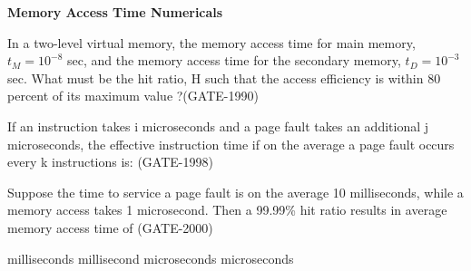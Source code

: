 \centerline{\textbf{ \LARGE Memory Access Time Numericals}}




\begin{questyle}

  \question  In a two-level virtual memory, the memory access time for main memory,   {\large \(  t_{M}=10^{-8}  \) }  sec,
            and the memory access time for the secondary memory,  {\large \( t_D=10^{-3} \) }  sec. What must be the hit
            ratio, H such that the access efficiency is within 80 percent of its maximum value \fillin[] ?(GATE-1990)

\end{questyle}


\begin{questyle}

  \question  If an instruction takes i microseconds and a page fault takes an additional j microseconds, the effective
              instruction time if on the average a  page fault occurs every k instructions is: (GATE-1998)

  \begin{choices}
  \end{choices}

\end{questyle}


\begin{questyle}

  \question  Suppose the time to service a page fault is on the average 10 milliseconds, while a memory access takes 1 microsecond.
             Then a 99.99\% hit ratio results in average memory access time of (GATE-2000)

  \begin{choices}
     milliseconds
     millisecond
     microseconds
     microseconds
  \end{choices}

\end{questyle}

